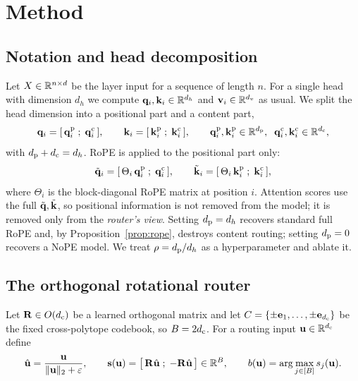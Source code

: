 \section{Method}
\label{sec:method}

\subsection{Notation and head decomposition}

Let $X \in \mathbb{R}^{n \times d}$ be the layer input for a sequence of length $n$. For a single head with dimension $d_h$ we compute $\mathbf{q}_i, \mathbf{k}_i \in \mathbb{R}^{d_h}$ and $\mathbf{v}_i \in \mathbb{R}^{d_v}$ as usual. We split the head dimension into a positional part and a content part,
\begin{equation}
  \mathbf{q}_i = [\,\mathbf{q}_i^{\mathrm{p}} \;;\; \mathbf{q}_i^{\mathrm{c}}\,], \qquad
  \mathbf{k}_i = [\,\mathbf{k}_i^{\mathrm{p}} \;;\; \mathbf{k}_i^{\mathrm{c}}\,], \qquad
  \mathbf{q}_i^{\mathrm{p}}, \mathbf{k}_i^{\mathrm{p}} \in \mathbb{R}^{d_{\mathrm{p}}}, \;\; \mathbf{q}_i^{\mathrm{c}}, \mathbf{k}_i^{\mathrm{c}} \in \mathbb{R}^{d_{\mathrm{c}}},
\end{equation}
with $d_{\mathrm{p}} + d_{\mathrm{c}} = d_h$. RoPE is applied to the positional part only:
\begin{equation}
  \tilde{\mathbf{q}}_i = [\, \Theta_i\,\mathbf{q}_i^{\mathrm{p}} \;;\; \mathbf{q}_i^{\mathrm{c}} \,], \qquad
  \tilde{\mathbf{k}}_i = [\, \Theta_i\,\mathbf{k}_i^{\mathrm{p}} \;;\; \mathbf{k}_i^{\mathrm{c}} \,],
\end{equation}
where $\Theta_i$ is the block-diagonal RoPE matrix at position $i$. Attention scores use the full $\tilde{\mathbf{q}}, \tilde{\mathbf{k}}$, so positional information is not removed from the model; it is removed only from the \emph{router's view}. Setting $d_{\mathrm{p}} = d_h$ recovers standard full RoPE and, by Proposition~\ref{prop:rope}, destroys content routing; setting $d_{\mathrm{p}} = 0$ recovers a NoPE model. We treat $\rho = d_{\mathrm{p}}/d_h$ as a hyperparameter and ablate it.

\subsection{The orthogonal rotational router}

\begin{definition}
\label{def:router}
Let $\mathbf{R} \in O(d_{\mathrm{c}})$ be a learned orthogonal matrix and let $C = \{\pm\mathbf{e}_1,\dots,\pm\mathbf{e}_{d_{\mathrm{c}}}\}$ be the fixed cross-polytope codebook, so $B = 2d_{\mathrm{c}}$. For a routing input $\mathbf{u} \in \mathbb{R}^{d_{\mathrm{c}}}$ define
\begin{equation}
  \hat{\mathbf{u}} = \frac{\mathbf{u}}{\|\mathbf{u}\|_2 + \varepsilon}, \qquad
  \mathbf{s}(\mathbf{u}) = \big[\, \mathbf{R}\hat{\mathbf{u}} \;;\; -\mathbf{R}\hat{\mathbf{u}} \,\big] \in \mathbb{R}^{B}, \qquad
  b(\mathbf{u}) = \arg\max_{j \in [B]} s_j(\mathbf{u}).
\end{equation}
\end{definition}

